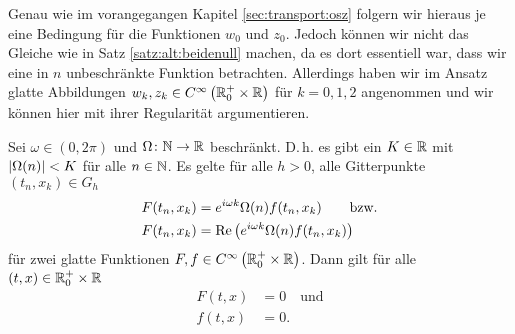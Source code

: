 Genau wie im vorangegangen Kapitel \ref{sec:transport:osz} folgern wir hieraus je eine Bedingung für die Funktionen $w_0$ und $z_0$.
Jedoch können wir nicht das Gleiche wie in Satz \ref{satz:alt:beidenull} machen, da es dort essentiell war, dass wir eine in $n$ unbeschränkte Funktion betrachten.
Allerdings haben wir im Ansatz glatte Abbildungen $w_k, z_k \in C^{\infty}\left( \mathbb R^+_0 \times \mathbb R \right)$ für $k = 0,1,2$ angenommen und wir können hier mit ihrer Regularität argumentieren.
\begin{satz}\label{satz:glgregulaer}
Sei $\omega \in (0, 2\pi)$ und $\Omega\colon \mathbb N \to \mathbb R$ beschränkt.
D.\,h. es gibt ein $K \in \mathbb R$ mit $\left| \Omega(n) \right| < K$ für alle $n \in \mathbb N$.
Es gelte für alle $h > 0$, alle Gitterpunkte $(t_n, x_k) \in G_h$
\begin{align}\label{satz:glgreg:vor}
\begin{split}
F(t_n, x_k) &= e^{i \omega k} \Omega(n) f(t_n, x_k) \qquad \text{bzw.}\\
F(t_n, x_k) &= \operatorname{Re}\left( e^{i \omega k} \Omega(n) f(t_n, x_k) \right)
\end{split}
\end{align}
für zwei glatte Funktionen $F,f \in C^{\infty}\left( \mathbb R^+_0 \times \mathbb R \right)$. Dann gilt für alle $(t,x) \in \mathbb R^+_0 \times \mathbb R$
\begin{align*}
F(t, x) &= 0 \quad \text{und}\\
f(t, x) &= 0.
\end{align*}
\end{satz}
